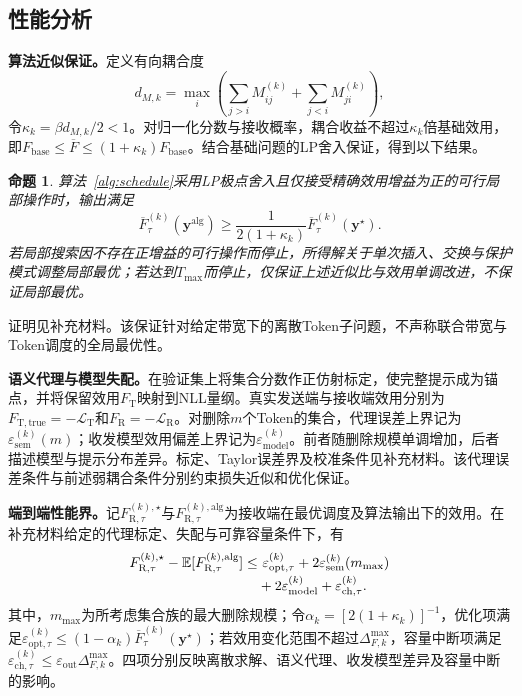 \documentclass[journal]{IEEEtran}
\newtheorem{proposition}{命题}
\begin{document}
\subsection{性能分析}
\label{sec:analysis}

\textbf{算法近似保证。}定义有向耦合度
\begin{equation}
d_{M,k}=\max_i\left(
\sum_{j>i}M_{ij}^{(k)}+\sum_{j<i}M_{ji}^{(k)}
\right),
\label{eq:directed_coupling_degree}
\end{equation}
令$\kappa_k=\beta d_{M,k}/2<1$。对归一化分数与接收概率，耦合收益不超过$\kappa_k$倍基础效用，即$F_{\mathrm{base}}\leq\overline F\leq(1+\kappa_k)F_{\mathrm{base}}$。结合基础问题的LP舍入保证，得到以下结果。

\begin{proposition}
\label{prop:coupled_approx}
算法~\ref{alg:schedule}采用LP极点舍入且仅接受精确效用增益为正的可行局部操作时，输出满足
\begin{equation}
\overline F_{\tau}^{(k)}(\bm y^{\mathrm{alg}})
\geq\frac{1}{2(1+\kappa_k)}
\overline F_{\tau}^{(k)}(\bm y^{\star}).
\label{eq:coupled_approximation}
\end{equation}
若局部搜索因不存在正增益的可行操作而停止，所得解关于单次插入、交换与保护模式调整局部最优；若达到$T_{\max}$而停止，仅保证上述近似比与效用单调改进，不保证局部最优。
\end{proposition}

证明见补充材料。该保证针对给定带宽下的离散Token子问题，不声称联合带宽与Token调度的全局最优性。

\textbf{语义代理与模型失配。}在验证集上将集合分数作正仿射标定，使完整提示成为锚点，并将保留效用$F_{\mathrm T}$映射到NLL量纲。真实发送端与接收端效用分别为$F_{\mathrm T,\mathrm{true}}=-\mathcal L_{\mathrm T}$和$F_{\mathrm R}=-\mathcal L_{\mathrm R}$。对删除$m$个Token的集合，代理误差上界记为$\varepsilon_{\mathrm{sem}}^{(k)}(m)$；收发模型效用偏差上界记为$\varepsilon_{\mathrm{model}}^{(k)}$。前者随删除规模单调增加，后者描述模型与提示分布差异。标定、Taylor误差界及校准条件见补充材料。该代理误差条件与前述弱耦合条件分别约束损失近似和优化保证。

\textbf{端到端性能界。}记$F_{\mathrm R,\tau}^{(k),\star}$与$F_{\mathrm R,\tau}^{(k),\mathrm{alg}}$为接收端在最优调度及算法输出下的效用。在补充材料给定的代理标定、失配与可靠容量条件下，有
\begin{align}
F_{\mathrm R,\tau}^{(k),\star}
-\mathbb E[F_{\mathrm R,\tau}^{(k),\mathrm{alg}}]
\leq&~\varepsilon_{\mathrm{opt},\tau}^{(k)}
+2\varepsilon_{\mathrm{sem}}^{(k)}(m_{\max})
\notag\\[-0.2em]
&+2\varepsilon_{\mathrm{model}}^{(k)}
+\varepsilon_{\mathrm{ch},\tau}^{(k)}.
\label{eq:end_to_end_gap}
\end{align}
其中，$m_{\max}$为所考虑集合族的最大删除规模；令$\alpha_k=[2(1+\kappa_k)]^{-1}$，优化项满足$\varepsilon_{\mathrm{opt},\tau}^{(k)}\leq(1-\alpha_k)\overline F_{\tau}^{(k)}(\bm y^\star)$；若效用变化范围不超过$\Delta_{F,k}^{\max}$，容量中断项满足$\varepsilon_{\mathrm{ch},\tau}^{(k)}\leq\varepsilon_{\mathrm{out}}\Delta_{F,k}^{\max}$。四项分别反映离散求解、语义代理、收发模型差异及容量中断的影响。
\end{document}

